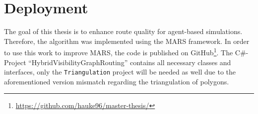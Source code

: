 \section{Deployment}

	The goal of this thesis is to enhance route quality for agent-based simulations.
	Therefore, the algorithm was implemented using the MARS framework.
	In order to use this work to improve MARS, the code is published on GitHub\footnote{\url{https://github.com/hauke96/master-thesis/}}.
	The C\#-Project \enquote{HybridVisibilityGraphRouting} contains all necessary classes and interfaces, only the \texttt{Triangulation} project will be needed as well due to the aforementioned version mismatch regarding the triangulation of polygons.